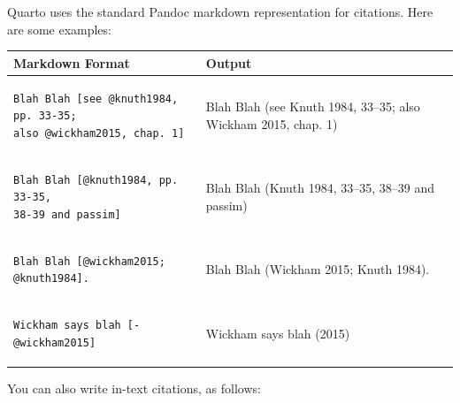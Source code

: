 \documentclass[
]{interact}
\newcounter{none} %
\begin{document}
Quarto uses the standard Pandoc markdown representation for citations.
Here are some examples:

{\def\LTcaptype{none} %
\begin{longtable}[]{@{}
  >{\raggedright\arraybackslash}p{}
  >{\raggedright\arraybackslash}p{}@{}}
\toprule\noalign{}
\begin{minipage}[b]{\linewidth}\raggedright
Markdown Format
\end{minipage} & \begin{minipage}[b]{\linewidth}\raggedright
Output
\end{minipage} \\
\midrule\noalign{}
\endhead
\bottomrule\noalign{}
\endlastfoot
\begin{minipage}[t]{\linewidth}\raggedright
\begin{verbatim}
Blah Blah [see @knuth1984, pp. 33-35;
also @wickham2015, chap. 1]
\end{verbatim}
\end{minipage} & Blah Blah (see Knuth 1984, 33--35; also Wickham 2015,
chap. 1) \\
\begin{minipage}[t]{\linewidth}\raggedright
\begin{verbatim}
Blah Blah [@knuth1984, pp. 33-35,
38-39 and passim]
\end{verbatim}
\end{minipage} & Blah Blah (Knuth 1984, 33--35, 38--39 and passim) \\
\begin{minipage}[t]{\linewidth}\raggedright
\begin{verbatim}
Blah Blah [@wickham2015; @knuth1984].
\end{verbatim}
\end{minipage} & Blah Blah (Wickham 2015; Knuth 1984). \\
\begin{minipage}[t]{\linewidth}\raggedright
\begin{verbatim}
Wickham says blah [-@wickham2015]
\end{verbatim}
\end{minipage} & Wickham says blah (2015) \\
\end{longtable}
}

You can also write in-text citations, as follows:
\end{document}
